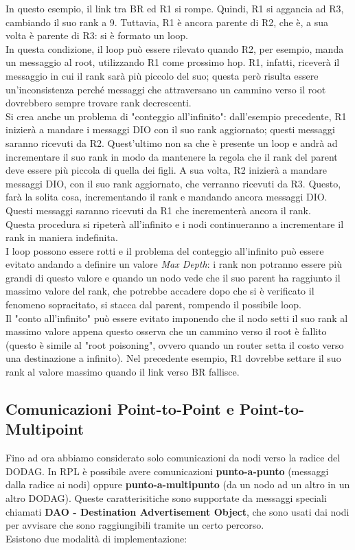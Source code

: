 \documentclass{article}
\begin{document}
In questo esempio, il link tra BR ed R1 si rompe. Quindi, R1 si aggancia ad R3, cambiando il suo rank a 9. Tuttavia, R1 è ancora parente di R2, che è, a sua volta è parente di R3: si è formato un loop. \\ In questa condizione, il loop può essere rilevato quando R2, per esempio, manda un messaggio al root, utilizzando R1 come prossimo hop. R1, infatti, riceverà il messaggio in cui il rank sarà più piccolo del suo; questa però risulta essere un'inconsistenza perché messaggi che attraversano un cammino verso il root dovrebbero sempre trovare rank decrescenti. \\ Si crea anche un problema di "conteggio all'infinito": dall'esempio precedente, R1 inizierà a mandare i messaggi DIO con il suo rank aggiornato; questi messaggi saranno ricevuti da R2. Quest'ultimo non sa che è presente un loop e andrà ad incrementare il suo rank in modo da mantenere la regola che il rank del parent deve essere più piccola di quella dei figli. A sua volta, R2 inizierà a mandare messaggi DIO, con il suo rank aggiornato, che verranno ricevuti da R3. Questo, farà la solita cosa, incrementando il rank e mandando ancora messaggi DIO. Questi messaggi saranno ricevuti da R1 che incrementerà ancora il rank. \\ Questa procedura si ripeterà all'infinito e i nodi continueranno a incrementare il rank in maniera indefinita. \\ I loop possono essere rotti e il problema del conteggio all'infinito può essere evitato andando a definire un valore \textit{Max Depth}: i rank non potranno essere più grandi di questo valore e quando un nodo vede che il suo parent ha raggiunto il massimo valore del rank, che potrebbe accadere dopo che si è verificato il fenomeno sopracitato, si stacca dal parent, rompendo il possibile loop. \\ Il "conto all'infinito" può essere evitato imponendo che il nodo setti il suo rank al massimo valore appena questo osserva che un cammino verso il root è fallito (questo è simile al "root poisoning", ovvero quando un router setta il costo verso una destinazione a infinito). Nel precedente esempio, R1 dovrebbe settare il suo rank al valore massimo quando il link verso BR fallisce.


\subsection{Comunicazioni Point-to-Point e Point-to-Multipoint}
Fino ad ora abbiamo considerato solo comunicazioni da nodi verso la radice del DODAG. In RPL è possibile avere comunicazioni \textbf{punto-a-punto} (messaggi dalla radice ai nodi) oppure \textbf{punto-a-multipunto} (da un nodo ad un altro in un altro DODAG). Queste caratterisitiche sono supportate da messaggi speciali chiamati \textbf{DAO - Destination Advertisement Object}, che sono usati dai nodi per avvisare che sono raggiungibili tramite un certo percorso.\\
Esistono due modalità di implementazione:
\end{document}
